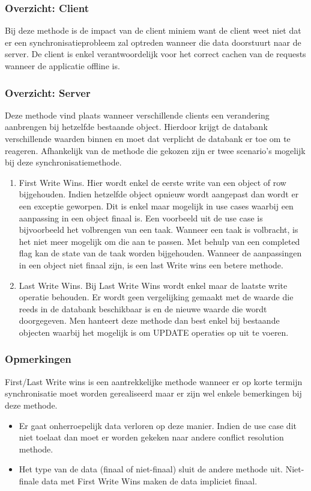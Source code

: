 \subsubsection{Overzicht: Client}
Bij deze methode is de impact van de client miniem want de client weet niet dat er een synchronisatieprobleem zal optreden wanneer die data doorstuurt naar de server. De client is enkel verantwoordelijk voor het correct cachen van de requests wanneer de applicatie offline is.
\subsubsection{Overzicht: Server}
Deze methode vind plaats wanneer verschillende clients een verandering aanbrengen bij hetzelfde bestaande object. Hierdoor krijgt de databank verschillende waarden binnen en moet dat verplicht de databank er toe om te reageren. Afhankelijk van de methode die gekozen zijn er twee scenario's mogelijk bij deze synchronisatiemethode.
\begin{enumerate}
\item First Write Wins. Hier wordt enkel de eerste write van een object of row bijgehouden. Indien hetzelfde object opnieuw wordt aangepast dan wordt er een exceptie geworpen. Dit is enkel maar mogelijk in use cases waarbij een aanpassing in een object finaal is. Een voorbeeld uit de use case is bijvoorbeeld het volbrengen van een taak. Wanneer een taak is volbracht, is het niet meer mogelijk om die aan te passen. Met behulp van een completed flag kan de state van de taak worden bijgehouden. Wanneer de aanpassingen in een object niet finaal zijn, is een last Write wins een betere methode.
\item Last Write Wins. Bij Last Write Wins wordt enkel maar de laatste write operatie behouden. Er wordt geen vergelijking gemaakt met de waarde die reeds in de databank beschikbaar is en de nieuwe waarde die wordt doorgegeven. Men hanteert deze methode dan best enkel bij bestaande objecten waarbij het mogelijk is om UPDATE operaties op uit te voeren.
\end{enumerate}
\subsubsection{Opmerkingen}
First/Last Write wins is een aantrekkelijke methode wanneer er op korte termijn synchronisatie moet worden gerealiseerd maar er zijn wel enkele bemerkingen bij deze methode.
\begin{itemize}
\item Er gaat onherroepelijk data verloren op deze manier. Indien de use case dit niet toelaat dan moet er worden gekeken naar andere conflict resolution methode.
\item Het type van de data (finaal of niet-finaal) sluit de andere methode uit. Niet-finale data met First Write Wins maken de data impliciet finaal.
\end{itemize}
